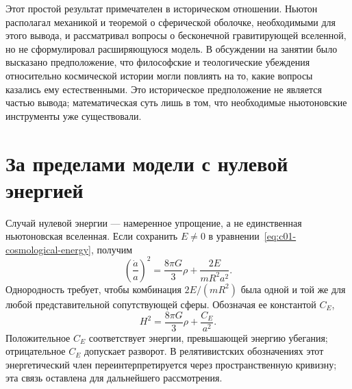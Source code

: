 \begin{classroomqa}
\end{classroomqa}

Этот простой результат примечателен в историческом отношении. Ньютон располагал механикой и теоремой о сферической оболочке, необходимыми для этого вывода, и рассматривал вопросы о бесконечной гравитирующей вселенной, но не сформулировал расширяющуюся модель. В обсуждении на занятии было высказано предположение, что философские и теологические убеждения относительно космической истории могли повлиять на то, какие вопросы казались ему естественными. Это историческое предположение не является частью вывода; математическая суть лишь в том, что необходимые ньютоновские инструменты уже существовали.

\begin{classroomqa}
\end{classroomqa}

\section{За пределами модели с нулевой энергией}

Случай нулевой энергии — намеренное упрощение, а не единственная ньютоновская вселенная. Если сохранить \(E\neq0\) в уравнении~\eqref{eq:c01-cosmological-energy}, получим
\begin{equation}
\left(\frac{\dot a}{a}\right)^2
=\frac{8\pi G}{3}\rho+\frac{2E}{mR^2a^2}.
\label{eq:c01-nonzero-energy}
\end{equation}
Однородность требует, чтобы комбинация \(2E/(mR^2)\) была одной и той же для любой представительной сопутствующей сферы. Обозначая ее константой \(C_E\),
\begin{equation}
H^2=\frac{8\pi G}{3}\rho+\frac{C_E}{a^2}.
\end{equation}
Положительное \(C_E\) соответствует энергии, превышающей энергию убегания; отрицательное \(C_E\) допускает разворот. В релятивистских обозначениях этот энергетический член переинтерпретируется через пространственную кривизну; эта связь оставлена для дальнейшего рассмотрения.

